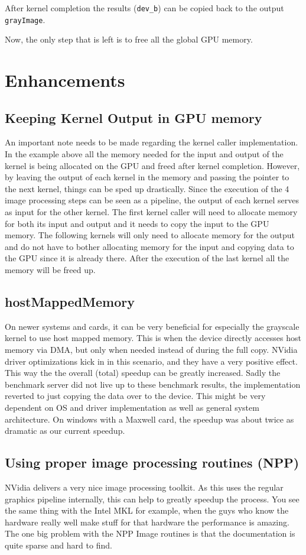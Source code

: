 \documentclass[final]{report}
\begin{document}
After kernel completion the results (\texttt{dev\_b}) can be copied back to the output \texttt{grayImage}.


Now, the only step that is left is to free all the global GPU memory.

\section{Enhancements}
\subsection{Keeping Kernel Output in GPU memory}
An important note needs to be made regarding the kernel caller implementation.
In the example above all the memory needed for the input and output of the kernel is being allocated on the GPU and freed after kernel completion.
However, by leaving the output of each kernel in the memory and passing the pointer to the next kernel, things can be sped up drastically.
Since the execution of the 4 image processing steps can be seen as a pipeline, the output of each kernel serves as input for the other kernel.
The first kernel caller will need to allocate memory for both its input and output and it needs to copy the input to the GPU memory.
The following kernels will only need to allocate memory for the output and do not have to bother allocating memory for the input and copying data to the GPU since it is already there.
After the execution of the last kernel all the memory will be freed up.

\subsection{hostMappedMemory}
On newer systems and cards, it can be very beneficial for especially the grayscale kernel to use host mapped memory.
This is when the device directly accesses host memory via DMA, but only when needed instead of during the full copy.
NVidia driver optimizations kick in in this scenario, and they have a very positive effect.
This way the the overall (total) speedup can be greatly increased.
Sadly the benchmark server did not live up to these benchmark results, the implementation reverted to just copying the data over to the device.
This might be very dependent on OS and driver implementation as well as general system architecture.
On windows with a Maxwell card, the speedup was about twice as dramatic as our current speedup.

\subsection{Using proper image processing routines (NPP)}
NVidia delivers a very nice image processing toolkit.
As this uses the regular graphics pipeline internally, this can help to greatly speedup the process.
You see the same thing with the Intel MKL for example, when the guys who know the hardware really well make stuff for that hardware the performance is amazing.
The one big problem with the NPP Image routines is that the documentation is quite sparse and hard to find.
\end{document}
